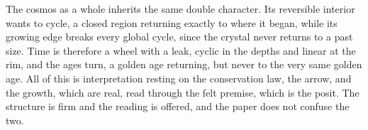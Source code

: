 The cosmos as a whole inherits the same double character. Its reversible interior wants to cycle, a closed region returning exactly to where it began, while its growing edge breaks every global cycle, since the crystal never returns to a past size. Time is therefore a wheel with a leak, cyclic in the depths and linear at the rim, and the ages turn, a golden age returning, but never to the very same golden age. All of this is interpretation resting on the conservation law, the arrow, and the growth, which are real, read through the felt premise, which is the posit. The structure is firm and the reading is offered, and the paper does not confuse the two.
